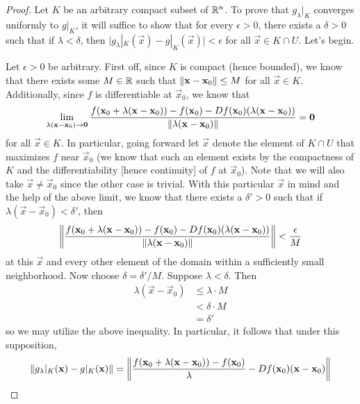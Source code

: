 \documentclass[../psets.tex]{subfiles}
\begin{document}
\begin{enumerate}
\begin{proof}
        Let $K$ be an arbitrary compact subset of $\mathbb{R}^n$. To prove that $g_\lambda|_K$ converges uniformly to $g|_K$, it will suffice to show that for every $\epsilon>0$, there exists a $\delta>0$ such that if $\lambda<\delta$, then $\big| g_\lambda|_K(\vec{x})-g|_K(\vec{x}) \big|<\epsilon$ for all $\vec{x}\in K\cap U$. Let's begin.\par
        Let $\epsilon>0$ be arbitrary. First off, since $K$ is compact (hence bounded), we know that there exists some $M\in\mathbb{R}$ such that $\norm{\mathbf{x}-\mathbf{x}_0}\leq M$ for all $\vec{x}\in K$. Additionally, since $f$ is differentiable at $\vec{x}_0$, we know that
        \begin{equation*}
            \lim_{\lambda(\mathbf{x}-\mathbf{x}_0)\to\bm{0}}\frac{f(\mathbf{x}_0+\lambda(\mathbf{x}-\mathbf{x}_0))-f(\mathbf{x}_0)-Df(\mathbf{x}_0)(\lambda(\mathbf{x}-\mathbf{x}_0))}{\norm{\lambda(\mathbf{x}-\mathbf{x}_0)}} = \bm{0}
        \end{equation*}
        for all $\vec{x}\in K$. In particular, going forward let $\vec{x}$ denote the element of $K\cap U$ that maximizes $f$ near $\vec{x}_0$ (we know that such an element exists by the compactness of $K$ and the differentiability [hence continuity] of $f$ at $\vec{x}_0$). Note that we will also take $\vec{x}\neq\vec{x}_0$ since the other case is trivial. With this particular $\vec{x}$ in mind and the help of the above limit, we know that there exists a $\delta'>0$ such that if $\lambda(\vec{x}-\vec{x}_0)<\delta'$, then
        \begin{equation*}
            \norm{\frac{f(\mathbf{x}_0+\lambda(\mathbf{x}-\mathbf{x}_0))-f(\mathbf{x}_0)-Df(\mathbf{x}_0)(\lambda(\mathbf{x}-\mathbf{x}_0))}{\norm{\lambda(\mathbf{x}-\mathbf{x}_0)}}} < \frac{\epsilon}{M}
        \end{equation*}
        at this $\vec{x}$ and every other element of the domain within a sufficiently small neighborhood. Now choose $\delta=\delta'/M$. Suppose $\lambda<\delta$. Then
        \begin{align*}
            \lambda(\vec{x}-\vec{x}_0) &\leq \lambda\cdot M\\
            &< \delta\cdot M\\
            &= \delta'
        \end{align*}
        so we may utilize the above inequality. In particular, it follows that under this supposition,
        \begin{align*}
            \norm{g_\lambda|_K(\vec{x})-g|_K(\vec{x})} &= \norm{\frac{f(\vec{x}_0+\lambda(\vec{x}-\vec{x}_0))-f(\vec{x}_0)}{\lambda}-Df(\vec{x}_0)(\vec{x}-\vec{x}_0)}\\

\end{align*}
\end{proof}
\end{enumerate}
\end{document}
